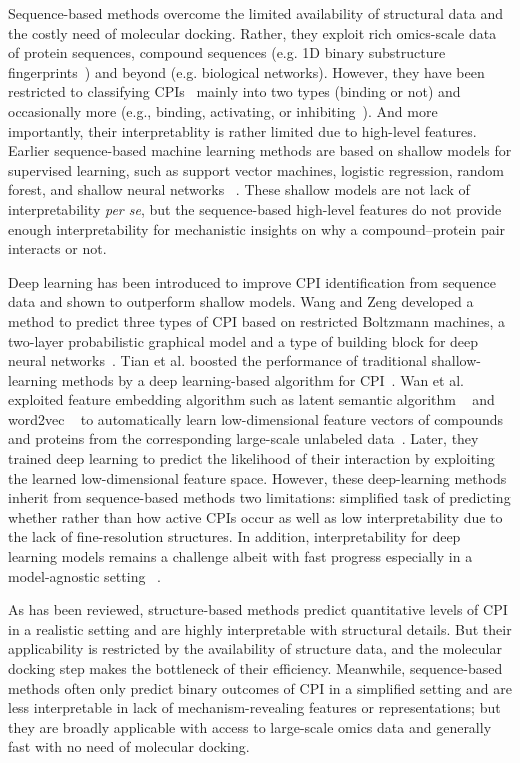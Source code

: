 \documentclass[nocrop]{bioinfo}
\begin{document}
Sequence-based methods overcome the limited availability of structural data and the costly need of molecular docking. Rather, they exploit rich omics-scale data of protein sequences, compound sequences  (e.g. 1D binary substructure fingerprints~\citep{wang2009pubchem}) and beyond  (e.g. biological networks).  However, they have been restricted to classifying CPIs~\citep{Chen2016CPIRev}  mainly into two types  (binding or not) and occasionally more  (e.g., binding, activating, or inhibiting~\citep{WangAndZeng2013}). And more importantly, their interpretablity is rather limited due to high-level features.  Earlier sequence-based machine learning methods are based on shallow models for supervised learning, such as support vector machines, logistic regression, random forest, and shallow neural networks ~\citep{cheng2012prediction_3, yu2012systematic,tabei2013scalable,shi2013protein, cheng2016effectively}. 
These shallow models are not lack of interpretability \textit{per se}, but the sequence-based high-level features do not provide enough interpretability for mechanistic insights on why a compound--protein pair interacts or not.  

Deep learning has been introduced to improve CPI identification from sequence data and shown to outperform shallow models.  Wang and Zeng developed a method to predict three types of CPI based on restricted Boltzmann machines, a two-layer probabilistic graphical model and a type of building block for deep neural networks~\citep{WangAndZeng2013}.  Tian et al. boosted the performance of traditional shallow-learning methods by a deep learning-based algorithm for CPI~\citep{tian2016boosting}. Wan et al. exploited feature embedding algorithm such as latent semantic algorithm ~\citep{deerwester1990indexing} and word2vec ~\citep{mikolov2013efficient} to automatically learn low-dimensional feature vectors of compounds and proteins from the corresponding large-scale unlabeled data~\citep{wan2016deep}. Later, they trained deep learning to predict the likelihood of their interaction by exploiting the learned low-dimensional feature space.  However, these deep-learning methods inherit from sequence-based methods two limitations: simplified task of predicting whether rather than how active CPIs occur as well as low interpretability due to the lack of fine-resolution structures. In addition, interpretability for deep learning models remains a challenge albeit with fast progress especially in a model-agnostic setting~\citep{LIME16,pmlr-v70-koh17a} .    

As has been reviewed, structure-based methods predict quantitative levels of CPI in a realistic setting and are highly interpretable with structural details. But their applicability is restricted by the availability of structure data, and the molecular docking step makes the bottleneck of their efficiency. Meanwhile, sequence-based methods often only predict binary outcomes of CPI in a simplified setting and are less interpretable in lack of mechanism-revealing features or representations; but they are broadly applicable with access to large-scale omics data and generally fast with no need of molecular docking.  
\end{document}
